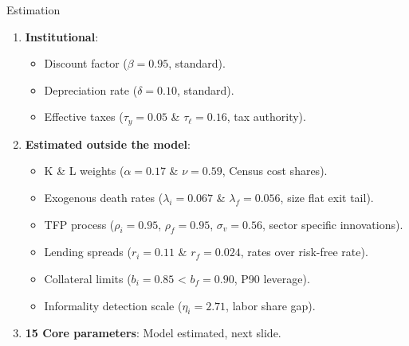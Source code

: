 \documentclass[aspectratio=169]{beamer}
\begin{document}
\begin{frame}{Estimation}\label{estimation}

\begin{enumerate}
    \item \textbf{Institutional}: 
    \begin{itemize}
        \item Discount factor ($\beta=0.95$, standard). 
        \item Depreciation rate ($\delta=0.10$, standard). 
        \item Effective taxes ($\tau_y=0.05$ \& $\tau_\ell=0.16$, tax authority).
    \end{itemize}
    \vspace{4mm}\pause
    \item \textbf{Estimated outside the model}: 
    \begin{itemize}
        \item K \& L weights ($\alpha=0.17$ \& $\nu=0.59$, Census cost shares).
        \item Exogenous death rates ($\lambda_i=0.067$ \& $\lambda_f=0.056$, size flat exit tail).
        \item TFP process ($\rho_i=0.95$, $\rho_f=0.95$, $\sigma_v=0.56$, sector specific innovations).
        \item Lending spreads ($r_i=0.11$ \& $r_f=0.024$, rates over risk-free rate).
        \item Collateral limits ($b_i=0.85$ < $b_f=0.90$, P90 leverage).
        \item Informality detection scale ($\eta_i=2.71$, labor share gap).
    \end{itemize}
    \vspace{4mm}\pause
    \item \textbf{15 Core parameters}: Model estimated, next slide.
\end{enumerate}

\end{frame}

\end{document}

